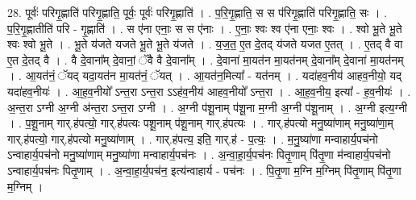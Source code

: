 \documentclass[17pt]{extarticle}
\begin{document}
28. पूर्वः॑ परिगृ॒ह्णाति॑ परिगृ॒ह्णाति॒ पूर्वः॒ पूर्वः॑ परिगृ॒ह्णाति॑ । . प॒रि॒गृ॒ह्णाति॒ स स प॑रिगृ॒ह्णाति॑ परिगृ॒ह्णाति॒ सः । . प॒रि॒गृ॒ह्णातीति॑ परि - गृ॒ह्णाति॑ । . स ए॑ना एनाः॒ स स ए॑नाः । . ए॒नाः॒ श्वः श्व ए॑ना एनाः॒ श्वः । . श्वो भू॒ते भू॒ते श्वः श्वो भू॒ते । . भू॒ते य॑जते यजते भू॒ते भू॒ते य॑जते । . य॒ज॒त॒ ए॒त दे॒तद् य॑जते यजत ए॒तत् । . ए॒तद् वै वा ए॒त दे॒तद् वै । . वै दे॒वाना᳚म् दे॒वानां॒ ॅवै वै दे॒वाना᳚म् । . दे॒वाना॑ मा॒यत॑न मा॒यत॑नम् दे॒वाना᳚म् दे॒वाना॑ मा॒यत॑नम् । . आ॒यत॑नं॒ ॅयद् यदा॒यत॑न मा॒यत॑नं॒ ॅयत् । . आ॒यत॑न॒मित्या᳚ - यत॑नम् । . यदा॑हव॒नीय॑ आहव॒नीयो॒ यद् यदा॑हव॒नीयः॑ । . आ॒ह॒व॒नीयो᳚ ऽन्त॒रा ऽन्त॒रा ऽऽह॑व॒नीय॑ आहव॒नीयो᳚ ऽन्त॒रा । . आ॒ह॒व॒नीय॒ इत्या᳚ - ह॒व॒नीयः॑ । . अ॒न्त॒रा ऽग्नी अ॒ग्नी अ॑न्त॒रा ऽन्त॒रा ऽग्नी । . अ॒ग्नी प॑शू॒नाम् प॑शू॒ना म॒ग्नी अ॒ग्नी प॑शू॒नाम् । . अ॒ग्नी इत्य॒ग्नी । . प॒शू॒नाम् गार्.ह॑पत्यो॒ गार्.ह॑पत्यः पशू॒नाम् प॑शू॒नाम् गार्.ह॑पत्यः । . गार्.ह॑पत्यो मनु॒ष्या॑णाम् मनु॒ष्या॑णा॒म् गार्.ह॑पत्यो॒ गार्.ह॑पत्यो मनु॒ष्या॑णाम् । . गार्.ह॑पत्य॒ इति॒ गार्.ह॑ - प॒त्यः॒ । . म॒नु॒ष्या॑णा मन्वाहार्य॒पच॑नो ऽन्वाहार्य॒पच॑नो मनु॒ष्या॑णाम् मनु॒ष्या॑णा मन्वाहार्य॒पच॑नः । . अ॒न्वा॒हा॒र्य॒पच॑नः पितृ॒णाम् पि॑तृ॒णा म॑न्वाहार्य॒पच॑नो ऽन्वाहार्य॒पच॑नः पितृ॒णाम् । . अ॒न्वा॒हा॒र्य॒पच॑न॒ इत्य॑न्वाहार्य - पच॑नः । . पि॒तृ॒णा म॒ग्नि म॒ग्निम् पि॑तृ॒णाम् पि॑तृ॒णा म॒ग्निम् । \newline
\end{document}

